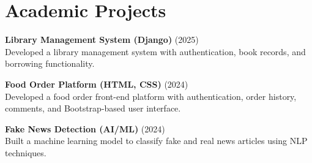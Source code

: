 \documentclass[a4paper,12pt]{article}
\begin{document}
\section{Academic Projects}
\textbf{Library Management System (Django)} \hfill (2025) \\
Developed a library management system with authentication, book records, and borrowing functionality.

\vspace{6pt}
\textbf{Food Order Platform (HTML, CSS)} \hfill (2024) \\
Developed a food order front-end platform with authentication, order history, comments, and Bootstrap-based user interface.

\vspace{6pt}
\textbf{Fake News Detection (AI/ML)} \hfill (2024) \\
Built a machine learning model to classify fake and real news articles using NLP techniques.

\vfill
{}
\end{document}
